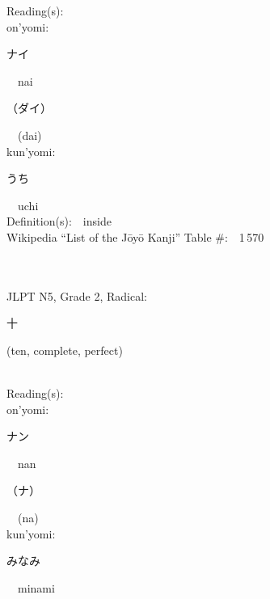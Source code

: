 \begin{multicols}{2}
Reading(s):\ \ \\
{\hspace*{1em}}on'yomi:\ \ \\
{\hspace*{2em}}{\begin{CJK}{UTF8}{min} ナイ \end{CJK}}\ \ nai\ \ \\
{\hspace*{2em}}{\begin{CJK}{UTF8}{min} （ダイ） \end{CJK}}\ \ (dai)\ \ \\
{\hspace*{1em}}kun'yomi:\ \ \\
{\hspace*{2em}}{\begin{CJK}{UTF8}{min} うち \end{CJK}}\ \ uchi\ \ \\
Definition(s):\ \ inside \\
Wikipedia ``List of the J\=oy\=o Kanji'' Table \#:\ \ 1\,570 \\
\ \ \\
{\fontsize{34pt}{40pt}  }\ \ \\  %
{JLPT N5, Grade 2, Radical:\ \ {\begin{CJK}{UTF8}{min} 十 \end{CJK}} (ten, complete, perfect) } \\
Reading(s):\ \ \\
{\hspace*{1em}}on'yomi:\ \ \\
{\hspace*{2em}}{\begin{CJK}{UTF8}{min} ナン \end{CJK}}\ \ nan\ \ \\
{\hspace*{2em}}{\begin{CJK}{UTF8}{min} （ナ） \end{CJK}}\ \ (na)\ \ \\
{\hspace*{1em}}kun'yomi:\ \ \\
{\hspace*{2em}}{\begin{CJK}{UTF8}{min} みなみ \end{CJK}}\ \ minami\ \ \\

\end{multicols}
